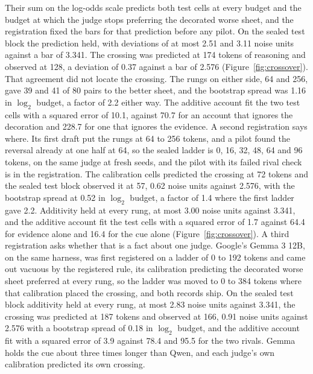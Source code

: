 \documentclass{article}
\theoremstyle{definition}
\theoremstyle{remark}
\begin{document}
Their sum on the log-odds scale predicts both test cells at every budget and the budget at which the judge stops preferring the decorated worse sheet, and the registration fixed the bars for that prediction before any pilot.
On the sealed test block the prediction held, with deviations of at most 2.51 and 3.11 noise units against a bar of 3.341.
The crossing was predicted at 174 tokens of reasoning and observed at 128, a deviation of 0.37 against a bar of 2.576 (Figure~\ref{fig:crossover}).
That agreement did not locate the crossing. The rungs on either side, 64 and 256, gave 39 and 41 of 80 pairs to the better sheet, and the bootstrap spread was 1.16 in $\log_{2}$ budget, a factor of 2.2 either way. The additive account fit the two test cells with a squared error of 10.1, against 70.7 for an account that ignores the decoration and 228.7 for one that ignores the evidence.
A second registration says where. Its first draft put the rungs at 64 to 256 tokens, and a pilot found the reversal already at one half at 64, so the sealed ladder is 0, 16, 32, 48, 64 and 96 tokens, on the same judge at fresh seeds, and the pilot with its failed rival check is in the registration. The calibration cells predicted the crossing at 72 tokens and the sealed test block observed it at 57, 0.62 noise units against 2.576, with the bootstrap spread at 0.52 in $\log_{2}$ budget, a factor of 1.4 where the first ladder gave 2.2. Additivity held at every rung, at most 3.00 noise units against 3.341, and the additive account fit the test cells with a squared error of 1.7 against 64.4 for evidence alone and 16.4 for the cue alone (Figure~\ref{fig:crossover}).
A third registration asks whether that is a fact about one judge. Google's Gemma 3 12B, on the same harness, was first registered on a ladder of 0 to 192 tokens and came out vacuous by the registered rule, its calibration predicting the decorated worse sheet preferred at every rung, so the ladder was moved to 0 to 384 tokens where that calibration placed the crossing, and both records ship. On the sealed test block additivity held at every rung, at most 2.83 noise units against 3.341, the crossing was predicted at 187 tokens and observed at 166, 0.91 noise units against 2.576 with a bootstrap spread of 0.18 in $\log_{2}$ budget, and the additive account fit with a squared error of 3.9 against 78.4 and 95.5 for the two rivals. Gemma holds the cue about three times longer than Qwen, and each judge's own calibration predicted its own crossing.
\end{document}
